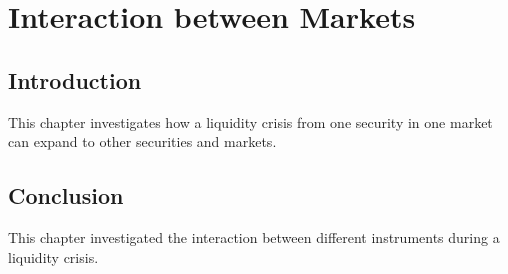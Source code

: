 %


\chapter{Interaction between Markets}
\label{chap:interaction}


\section{Introduction}

This chapter investigates how a liquidity crisis from one security in one market can expand to other securities and markets.

\section{Conclusion}
\label{sec:interaction:conclusion}

This chapter investigated the interaction between different instruments during a liquidity crisis.

